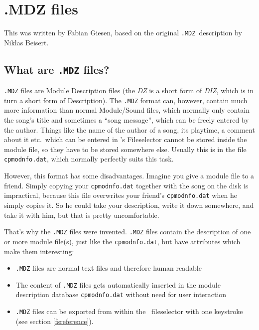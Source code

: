 %
%

\chapter{.MDZ files}
\label{mdz}
This was written by Fabian Giesen, based on the original
\texttt{.MDZ}\ description by Niklas Beisert.

\section{What are \texttt{.MDZ} files?}

\texttt{.MDZ} files are Module Description files (the \emph{DZ} is a short
form of \emph{DIZ}, which is in turn a short form of Description).
The \texttt{.MDZ} format can, however, contain much more information than
normal Module/Sound files, which normally only contain the song's title and
sometimes a ``song message'', which can be freely entered by the author.
Things like the name of the author of a song, its playtime, a comment about
it etc.\ which can be entered in \cp's Fileselector cannot be stored inside
the module file, so they have to be stored somewhere else. Usually this is
in the file \texttt{cpmodnfo.dat}, which normally perfectly suits this task.

However, this format has some disadvantages. Imagine you give a module file
to a friend. Simply copying your \texttt{cpmodnfo.dat} together with the
song on the disk is impractical, because this file overwrites your friend's
\texttt{cpmodnfo.dat} when he simply copies it. So he could take your
description, write it down somewhere, and take it with him, but that is
pretty uncomfortable.

That's why the \texttt{.MDZ} files were invented. \texttt{.MDZ} files
contain the description of one or more module file(s), just like the
\texttt{cpmodnfo.dat}, but have attributes which make them interesting:

\begin{itemize}
\item{\texttt{.MDZ} files are normal text files and therefore human readable}
\item{The content of \texttt{.MDZ} files gets automatically inserted in the
module description database \texttt{cpmodnfo.dat} without need for user
interaction}
\item{\texttt{.MDZ} files can be exported from within the \cp\ fileselector
with one keystroke (see section \ref{fsreference}).}
\end{itemize}

